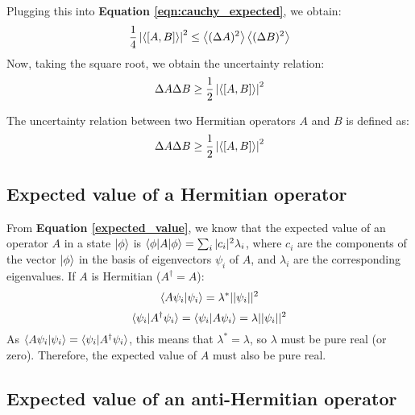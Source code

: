 Plugging this into \textbf{Equation \ref{eqn:cauchy_expected}}, we obtain:
\begin{equation}
    \frac14 \left|\left\langle[A, B]\right\rangle\right|^2 \leq \left\langle(\Delta A)^2\right\rangle\left\langle(\Delta B)^2\right\rangle
\end{equation}
Now, taking the square root, we obtain the uncertainty relation:
\begin{equation}
    \Delta A\Delta B \geq \frac12 \left|\left\langle[A, B]\right\rangle\right|^2
\end{equation}

\begin{definition}
    The uncertainty relation between two Hermitian operators $A$ and $B$ is defined as:
    \begin{equation}
        \Delta A\Delta B \geq \frac12 \left|\left\langle[A, B]\right\rangle\right|^2
    \end{equation}
\end{definition}

\subsection{Expected value of a Hermitian operator} \label{expected_value_hermitian}

From \textbf{Equation \ref{expected_value}}, we know that the expected value of an operator $A$ in a state $\ket{\phi}$ is $\braket{\phi|A|\phi} = \sum_i|c_i|^2\lambda_i$, where $c_i$ are the components of the vector $\ket{\phi}$ in the basis of eigenvectors $\psi_i$ of $A$, and $\lambda_i$ are the corresponding eigenvalues. If $A$ is Hermitian ($A^\dagger = A$):
\begin{equation}
    \braket{A\psi_i|\psi_i} = \lambda^*||\psi_i||^2
\end{equation}
\begin{equation}
    \braket{\psi_i|A^\dagger\psi_i} = \braket{\psi_i|A\psi_i} = \lambda||\psi_i||^2
\end{equation} 
As $\braket{A\psi_i|\psi_i} = \braket{\psi_i|A^\dagger \psi_i}$, this means that $\lambda^* = \lambda$, so $\lambda$ must be pure real (or zero). Therefore, the expected value of $A$ must also be pure real.

\subsection{Expected value of an anti-Hermitian operator} \label{expected_value_anti_hermitian}


